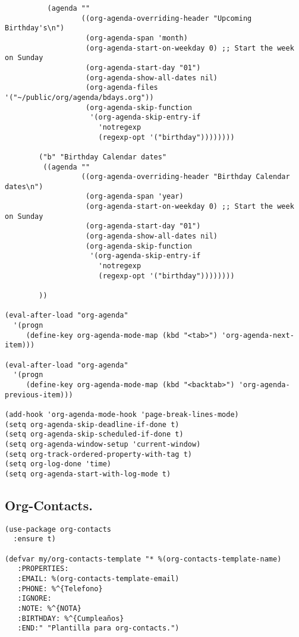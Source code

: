 \documentclass[11pt]{article}
\begin{document}
\begin{verbatim}
          (agenda ""
                  ((org-agenda-overriding-header "Upcoming Birthday's\n")
                   (org-agenda-span 'month)
                   (org-agenda-start-on-weekday 0) ;; Start the week on Sunday
                   (org-agenda-start-day "01")
                   (org-agenda-show-all-dates nil)
                   (org-agenda-files '("~/public/org/agenda/bdays.org"))
                   (org-agenda-skip-function
                    '(org-agenda-skip-entry-if
                      'notregexp
                      (regexp-opt '("birthday"))))))))

        ("b" "Birthday Calendar dates"
         ((agenda ""
                  ((org-agenda-overriding-header "Birthday Calendar dates\n")
                   (org-agenda-span 'year)
                   (org-agenda-start-on-weekday 0) ;; Start the week on Sunday
                   (org-agenda-start-day "01")
                   (org-agenda-show-all-dates nil)
                   (org-agenda-skip-function
                    '(org-agenda-skip-entry-if
                      'notregexp
                      (regexp-opt '("birthday"))))))))

        ))

(eval-after-load "org-agenda"
  '(progn
     (define-key org-agenda-mode-map (kbd "<tab>") 'org-agenda-next-item)))

(eval-after-load "org-agenda"
  '(progn
     (define-key org-agenda-mode-map (kbd "<backtab>") 'org-agenda-previous-item)))

(add-hook 'org-agenda-mode-hook 'page-break-lines-mode)
(setq org-agenda-skip-deadline-if-done t)
(setq org-agenda-skip-scheduled-if-done t)
(setq org-agenda-window-setup 'current-window)
(setq org-track-ordered-property-with-tag t)
(setq org-log-done 'time)
(setq org-agenda-start-with-log-mode t)
\end{verbatim}
\subsection{Org-Contacts.}
\label{sec:org08b2810}
\begin{verbatim}
(use-package org-contacts
  :ensure t)

(defvar my/org-contacts-template "* %(org-contacts-template-name)
   :PROPERTIES:
   :EMAIL: %(org-contacts-template-email)
   :PHONE: %^{Telefono}
   :IGNORE:
   :NOTE: %^{NOTA}
   :BIRTHDAY: %^{Cumpleaños}
   :END:" "Plantilla para org-contacts.")
\end{verbatim}
\end{document}
